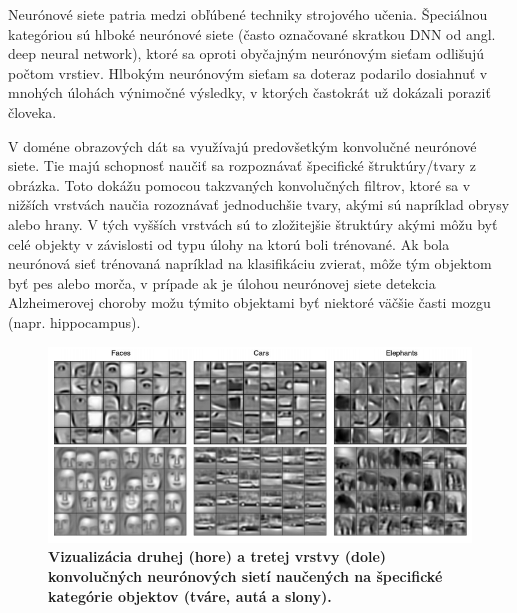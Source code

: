 Neurónové siete patria medzi obľúbené techniky strojového učenia. Špeciálnou kategóriou sú hlboké neurónové siete (často označované skratkou DNN od angl. deep neural network), ktoré sa oproti obyčajným neurónovým sieťam odlišujú počtom vrstiev. Hlbokým neurónovým sieťam sa doteraz podarilo dosiahnuť v mnohých úlohách výnimočné výsledky, v ktorých častokrát už dokázali poraziť človeka. %

V doméne obrazových dát sa využívajú predovšetkým konvolučné neurónové siete. Tie majú schopnosť naučiť sa rozpoznávať špecifické štruktúry/tvary z obrázka. Toto dokážu pomocou takzvaných konvolučných filtrov, ktoré sa v nižších vrstvách naučia rozoznávať jednoduchšie tvary, akými sú napríklad obrysy alebo hrany. V tých vyšších vrstvách sú to zložitejšie štruktúry akými môžu byť celé objekty v závislosti od typu úlohy na ktorú boli trénované. Ak bola neurónová sieť trénovaná napríklad na klasifikáciu zvierat, môže tým objektom byť pes alebo morča, v prípade ak je úlohou neurónovej siete detekcia Alzheimerovej choroby možu týmito objektami byť niektoré väčšie časti mozgu (napr. hippocampus).

\begin{figure}[h!]
\centering
\includegraphics[scale=0.5]{assets/images/cnn.png}
\caption{
    \textbf{Vizualizácia druhej (hore) a tretej vrstvy (dole) konvolučných neurónových sietí naučených na špecifické kategórie objektov (tváre, autá a slony). \cite{Lee_Grosse_Ranganath_Ng}}
}
\label{fig:cnn}
\end{figure}




